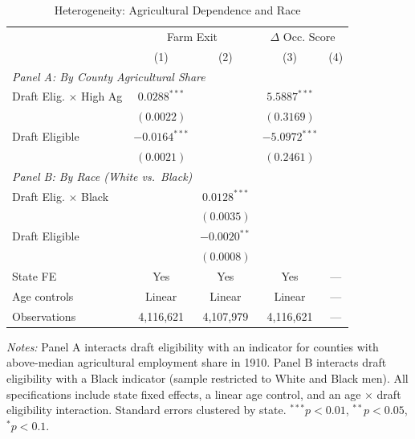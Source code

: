 \begin{table}[t]
\centering
\begin{threeparttable}
\caption{Heterogeneity: Agricultural Dependence and Race}
\label{tab:heterogeneity}
\begin{tabular}{lcccc}
\hline\hline
 & \multicolumn{2}{c}{Farm Exit} & \multicolumn{2}{c}{$\Delta$ Occ. Score} \\
 & (1) & (2) & (3) & (4) \\
\hline
\multicolumn{5}{l}{\textit{Panel A: By County Agricultural Share}} \\
Draft Elig. $\times$ High Ag & $0.0288^{***}$ & & $5.5887^{***}$ & \\
 & $(0.0022)$ & & $(0.3169)$ & \\
Draft Eligible & $-0.0164^{***}$ & & $-5.0972^{***}$ & \\
 & $(0.0021)$ & & $(0.2461)$ & \\
\hline
\multicolumn{5}{l}{\textit{Panel B: By Race (White vs.\ Black)}} \\
Draft Elig. $\times$ Black & & $0.0128^{***}$ & & \\
 & & $(0.0035)$ & & \\
Draft Eligible & & $-0.0020^{**}$ & & \\
 & & $(0.0008)$ & & \\
\hline
State FE & Yes & Yes & Yes & --- \\
Age controls & Linear & Linear & Linear & --- \\
Observations & 4,116,621 & 4,107,979 & 4,116,621 & --- \\
\hline\hline
\end{tabular}
\begin{tablenotes}[flushleft]\small
\item \textit{Notes:} Panel A interacts draft eligibility with an indicator for counties with above-median agricultural employment share in 1910. Panel B interacts draft eligibility with a Black indicator (sample restricted to White and Black men). All specifications include state fixed effects, a linear age control, and an age $\times$ draft eligibility interaction. Standard errors clustered by state. $^{***}p<0.01$, $^{**}p<0.05$, $^{*}p<0.1$.
\end{tablenotes}
\end{threeparttable}
\end{table}

